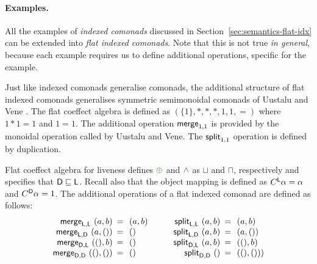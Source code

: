 \paragraph{Examples.}
All the examples of \emph{indexed comonads} discussed in Section~\ref{sec:semantics-flat-idx} can
be extended into \emph{flat indexed comonads}. Note that this is not true \emph{in general}, 
because each example requires us to define additional operations, specific for the example.

\begin{example}
Just like indexed comonads generalise co\-monads, the additional structure of
flat indexed comonads generalises symmetric semimonoidal comonads of Uustalu 
and Vene \cite{comonads-notions}. The flat coeffect algebra is defined as $(\{1\}, \ast, \ast, \ast, 1, 1, =)$
where $1\ast1=1$ and $1=1$. The additional operation $\textnormal{\sffamily merge}_{1,1}$ is provided by the 
monoidal operation called  by Uustalu and Vene. The $\textnormal{\sffamily split}_{1,1}$ operation 
is defined by duplication.
\end{example}

\begin{example}
\label{thm:semantics-indexed-opt}
  
Flat coeffect algebra for liveness defines $\cpar$ and $\czip$ as $\sqcup$ and $\sqcap$, respectively 
and specifies that $\textnormal{\sffamily D} \sqsubseteq \textnormal{\sffamily L}$. Recall also that the object mapping is defined 
as $C^{\textnormal{\sffamily L}}\alpha = \alpha$ and $C^{\textnormal{\sffamily D}}\alpha = 1$. The additional operations 
of a flat indexed comonad are defined as follows:
%
\begin{equation*}
\begin{array}{rcl}
\ident{merge}_{\ident{L}, \ident{L}}~(a, b) &\narrow{=}& (a, b)\\
\ident{merge}_{\ident{L}, \ident{D}}~(a, ()) &\narrow{=}& ()\\
\ident{merge}_{\ident{D}, \ident{L}}~((), b) &\narrow{=}& ()\\
\ident{merge}_{\ident{D}, \ident{D}}~((), ()) &\narrow{=}& ()\\
\end{array}
\qquad
\begin{array}{rcl}
\ident{split}_{\ident{L}, \ident{L}}~(a, b) &\narrow{=}& (a, b)\\
\ident{split}_{\ident{L}, \ident{D}}~(a, b) &\narrow{=}& (a, ())\\
\ident{split}_{\ident{D}, \ident{L}}~(a, b) &\narrow{=}& ((), b)\\
\ident{split}_{\ident{D}, \ident{D}}~() &\narrow{=}& ((), ()))\\
\end{array}
\end{equation*}
\end{example}

